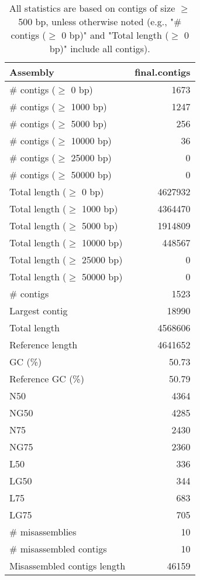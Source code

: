 \documentclass[12pt,a4paper]{article}
\begin{document}
\begin{table}[ht]
\begin{center}
\caption{All statistics are based on contigs of size $\geq$ 500 bp, unless otherwise noted (e.g., "\# contigs ($\geq$ 0 bp)" and "Total length ($\geq$ 0 bp)" include all contigs).}
\begin{tabular}{|l*{1}{|r}|}
\hline
Assembly & final.contigs \\ \hline
\# contigs ($\geq$ 0 bp) & 1673 \\ \hline
\# contigs ($\geq$ 1000 bp) & 1247 \\ \hline
\# contigs ($\geq$ 5000 bp) & 256 \\ \hline
\# contigs ($\geq$ 10000 bp) & 36 \\ \hline
\# contigs ($\geq$ 25000 bp) & 0 \\ \hline
\# contigs ($\geq$ 50000 bp) & 0 \\ \hline
Total length ($\geq$ 0 bp) & 4627932 \\ \hline
Total length ($\geq$ 1000 bp) & 4364470 \\ \hline
Total length ($\geq$ 5000 bp) & 1914809 \\ \hline
Total length ($\geq$ 10000 bp) & 448567 \\ \hline
Total length ($\geq$ 25000 bp) & 0 \\ \hline
Total length ($\geq$ 50000 bp) & 0 \\ \hline
\# contigs & 1523 \\ \hline
Largest contig & 18990 \\ \hline
Total length & 4568606 \\ \hline
Reference length & 4641652 \\ \hline
GC (\%) & 50.73 \\ \hline
Reference GC (\%) & 50.79 \\ \hline
N50 & 4364 \\ \hline
NG50 & 4285 \\ \hline
N75 & 2430 \\ \hline
NG75 & 2360 \\ \hline
L50 & 336 \\ \hline
LG50 & 344 \\ \hline
L75 & 683 \\ \hline
LG75 & 705 \\ \hline
\# misassemblies & 10 \\ \hline
\# misassembled contigs & 10 \\ \hline
Misassembled contigs length & 46159 \\ \hline

\end{tabular}
\end{center}
\end{table}
\end{document}
